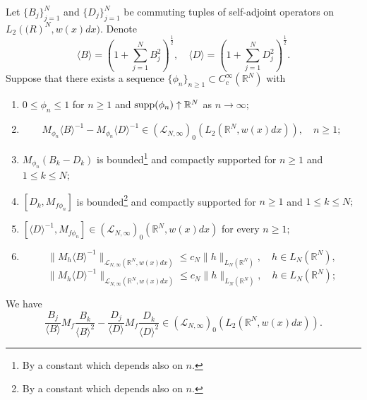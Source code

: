 \documentclass{amsart}
\begin{document}
\begin{lemma}\label{s11 abstract lemma} Let $\{B_j\}_{j=1}^N$ and $\{D_j\}_{j=1}^N$ be commuting tuples of self-adjoint operators on $L_2(\mathbb(R)^N,w(x)dx).$ Denote
$$\langle B\rangle=(1+\sum_{j=1}^NB_j^2)^{\frac12},\quad\langle D\rangle=(1+\sum_{j=1}^ND_j^2)^{\frac12}.$$ Suppose that there exists a sequence $\{\phi_n\}_{n\geq1}\subset C^{\infty}_c(\mathbb{R}^N)$ with
\begin{enumerate}[{\rm (i)}]
\item $0\leq\phi_n\leq1$ for $n\geq1$ and ${\rm supp}(\phi_n)\uparrow\mathbb{R}^N$ as $n\to\infty;$
\item
$$M_{\phi_n}\langle B\rangle^{-1}-M_{\phi_n}\langle D\rangle^{-1}\in(\mathcal{L}_{N,\infty})_0(L_2(\mathbb{R}^N,w(x)dx)),\quad n\geq1;$$
\item $M_{\phi_n}(B_k-D_k)$ is bounded\footnote{By a constant which depends also on $n.$} and compactly supported for $n\geq 1$ and $1\leq k\leq N;$
\item $[D_k,M_{f\phi_n}]$ is bounded\footnote{By a constant which depends also on $n.$} and compactly supported for $n\geq 1$ and $1\leq k\leq N;$
\item $[\langle D\rangle^{-1},M_{f\phi_n}]\in(\mathcal{L}_{N,\infty})_0(\mathbb{R}^N,w(x)dx)$ for every $n\geq1;$
\item
$$\|M_h\langle B\rangle^{-1}\|_{\mathcal{L}_{N,\infty}(\mathbb{R}^N,w(x)dx)}\leq c_N\|h\|_{L_N(\mathbb{R}^N)},\quad h\in L_N(\mathbb{R}^N),$$
$$\|M_h\langle D\rangle^{-1}\|_{\mathcal{L}_{N,\infty}(\mathbb{R}^N,w(x)dx)}\leq c_N\|h\|_{L_N(\mathbb{R}^N)},\quad h\in L_N(\mathbb{R}^N);$$
\end{enumerate}
We have
$$\frac{B_j}{\langle B\rangle}M_f\frac{B_k}{\langle B\rangle^2}-\frac{D_j}{\langle D\rangle}M_f\frac{D_k}{\langle D\rangle^2}\in(\mathcal{L}_{N,\infty})_0(L_2(\mathbb{R}^N,w(x)dx)).$$
\end{lemma}
\end{document}
